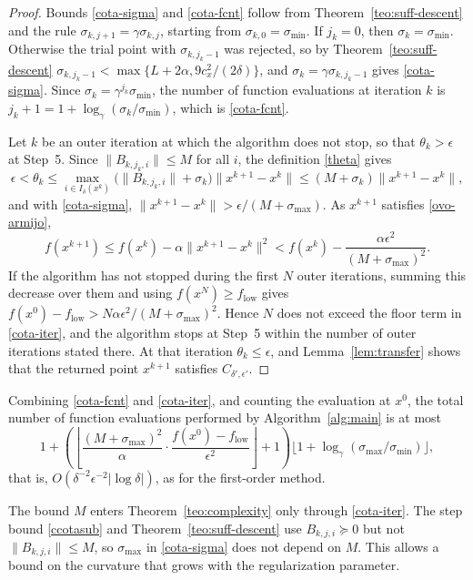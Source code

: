 \documentclass[11pt]{article}
\newcommand{\flow}{f_{\mathrm{low}}}
\newcounter{alg}[section]
\begin{document}
\begin{proof}
Bounds \eqref{cota-sigma} and \eqref{cota-fcnt} follow from
Theorem~\ref{teo:suff-descent} and the rule
$\sigma_{k,j+1} = \gamma\sigma_{k,j}$, starting from
$\sigma_{k,0} = \sigma_{\min}$. If $j_k = 0$, then
$\sigma_k = \sigma_{\min}$. Otherwise the trial point with
$\sigma_{k,j_k-1}$ was rejected, so by Theorem~\ref{teo:suff-descent}
$\sigma_{k,j_k-1} < \max\{L + 2\alpha, 9c_x^2/(2\delta)\}$, and
$\sigma_k = \gamma\sigma_{k,j_k-1}$ gives \eqref{cota-sigma}. Since
$\sigma_k = \gamma^{j_k}\sigma_{\min}$, the number of function evaluations at
iteration $k$ is $j_k + 1 = 1 + \log_\gamma(\sigma_k/\sigma_{\min})$, which is
\eqref{cota-fcnt}.

Let $k$ be an outer iteration at which the algorithm does not stop, so that
$\theta_k > \epsilon$ at Step~5. Since $\|B_{k,j_k,i}\| \leq M$ for all $i$,
the definition \eqref{theta} gives
\[
\epsilon < \theta_k
\leq \max_{i \in I_\delta(x^k)} \big( \|B_{k,j_k,i}\| + \sigma_k \big)
\|x^{k+1} - x^k\|
\leq (M + \sigma_k) \|x^{k+1} - x^k\|,
\]
and with \eqref{cota-sigma},
$\|x^{k+1} - x^k\| > \epsilon / ( M + \sigma_{\max} )$.
As $x^{k+1}$ satisfies \eqref{ovo-armijo},
\[
f(x^{k+1}) \leq f(x^k) - \alpha\|x^{k+1} - x^k\|^2
< f(x^k) - \frac{\alpha\epsilon^2}
{( M + \sigma_{\max} )^2}.
\]
If the algorithm has not stopped during the first $N$ outer iterations, summing
this decrease over them and using $f(x^N) \geq \flow$ gives
$f(x^0) - \flow > N \alpha\epsilon^2 /
( M + \sigma_{\max} )^2$. Hence $N$ does
not exceed the floor term in \eqref{cota-iter}, and the algorithm stops at
Step~5 within the number of outer iterations stated there. At that iteration
$\theta_k \leq \epsilon$, and Lemma~\ref{lem:transfer} shows that the returned
point $x^{k+1}$ satisfies $C_{\delta',\epsilon'}$.
\end{proof}

Combining \eqref{cota-fcnt} and \eqref{cota-iter}, and counting the evaluation
at $x^0$, the total number of function evaluations performed by
Algorithm~\ref{alg:main} is at most
\[
1 + \left( \left\lfloor \frac{(M + \sigma_{\max})^2}{\alpha}
\cdot \frac{f(x^0) - \flow}{\epsilon^2} \right\rfloor + 1 \right)
\big\lfloor 1 + \log_\gamma(\sigma_{\max}/\sigma_{\min}) \big\rfloor,
\]
that is, $O(\delta^{-2}\epsilon^{-2}|\log\delta|)$, as for the first-order method.

The bound $M$ enters Theorem~\ref{teo:complexity} only through
\eqref{cota-iter}. The step bound \eqref{ccotasub} and
Theorem~\ref{teo:suff-descent} use $B_{k,j,i} \succeq 0$ but not
$\|B_{k,j,i}\| \leq M$, so $\sigma_{\max}$ in \eqref{cota-sigma} does not
depend on $M$. This allows a bound on the curvature that grows with the
regularization parameter.
\end{document}
